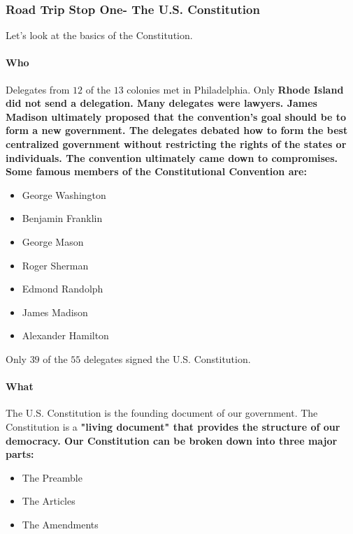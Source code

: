 
\subsubsection*{Road Trip Stop One- The U.S. Constitution}

Let's look at the basics of the Constitution.

\paragraph{Who} Delegates from  $12$ of the $13$ colonies met in Philadelphia. Only \bf{Rhode Island} did not send a delegation. Many delegates were lawyers. \bf{James Madison} ultimately proposed that the convention's goal should be to form a new government. The delegates debated how to form the best centralized government without restricting the rights of the states or individuals. The convention ultimately came down to compromises. Some famous members of the \bf{Constitutional Convention} are:

\begin{itemize}
    \item George Washington
    \item Benjamin Franklin
    \item George Mason
    \item Roger Sherman
    \item Edmond Randolph
    \item James Madison
    \item Alexander Hamilton
\end{itemize}

Only $39$ of the $55$ delegates signed the U.S. Constitution.

\paragraph{What} The U.S. Constitution is the founding document of our government. The Constitution is a \bf{"living document"} that provides the structure of our democracy. Our Constitution can be broken down into three major parts:

\begin{itemize}
    \item The Preamble
    \item The Articles
    \item The Amendments
\end{itemize}

